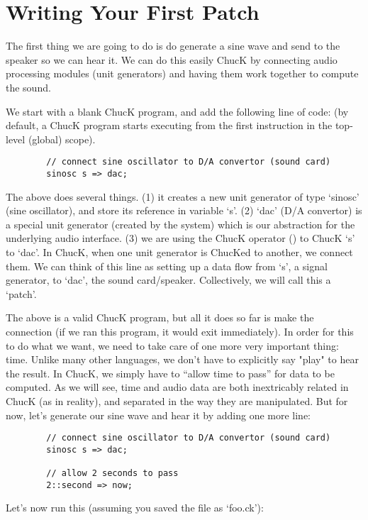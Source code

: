 \section{Writing Your First Patch}

The first thing we are going to do is do generate a sine wave and send to the speaker so we can hear it. We can do this easily ChucK by connecting audio processing modules (unit generators) and having them work together to compute the sound. 

We start with a blank ChucK program, and add the following line of code: (by default, a ChucK program starts executing from the first instruction in the top-level (global) scope).
\begin{verbatim}
        // connect sine oscillator to D/A convertor (sound card)
        sinosc s => dac;
\end{verbatim}

The above does several things. (1) it creates a new unit generator of type `sinosc' (sine oscillator), and store its reference in variable `s'. (2) `dac' (D/A convertor) is a special unit generator (created by the system) which is our abstraction for the underlying audio interface. (3) we are using the ChucK operator (\chuckop) to ChucK `s' to `dac'. In ChucK, when one unit generator is ChucKed to another, we connect them. We can think of this line as setting up a data flow from `s', a signal generator, to `dac', the sound card/speaker. Collectively, we will call this a `patch'. 

The above is a valid ChucK program, but all it does so far is make the connection (if we ran this program, it would exit immediately). In order for this to do what we want, we need to take care of one more very important thing: time. Unlike many other languages, we don't have to explicitly say "play" to hear the result. In ChucK, we simply have to ``allow time to pass'' for data to be computed. As we will see, time and audio data are both inextricably related in ChucK (as in reality), and separated in the way they are manipulated. But for now, let's generate our sine wave and hear it by adding one more line:

\begin{verbatim}
        // connect sine oscillator to D/A convertor (sound card)
        sinosc s => dac;

        // allow 2 seconds to pass
        2::second => now;
\end{verbatim}

Let's now run this (assuming you saved the file as `foo.ck'):

